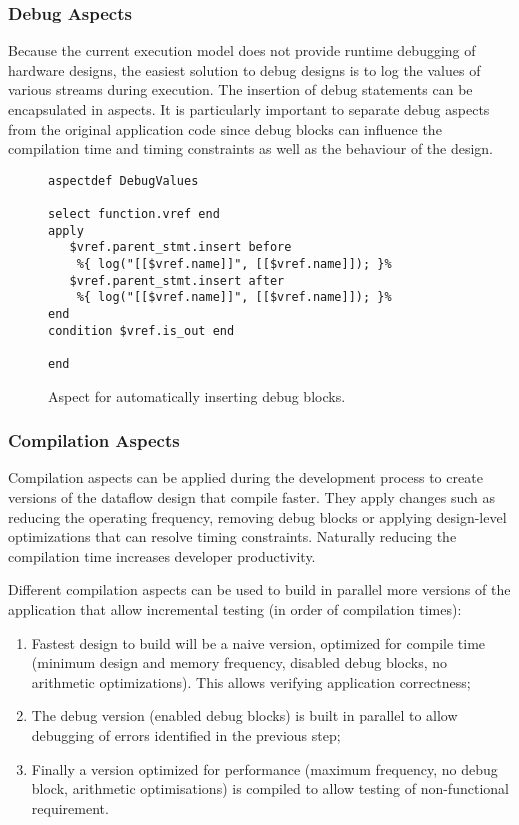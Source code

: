 \lstset{style=MaxC}


\subsubsection{Debug Aspects}

Because the current execution model does not provide runtime debugging
of hardware designs, the easiest solution to debug designs is to log
the values of various streams during execution. The insertion of debug
statements can be encapsulated in aspects. It is particularly
important to separate debug aspects from the original application code
since debug blocks can influence the compilation time and timing
constraints as well as the behaviour of the design.

\lstset{style=lara}
\begin{figure}[!h]
  \centering
\begin{lstlisting}
aspectdef DebugValues

select function.vref end
apply
   $vref.parent_stmt.insert before
    %{ log("[[$vref.name]]", [[$vref.name]]); }%
   $vref.parent_stmt.insert after
    %{ log("[[$vref.name]]", [[$vref.name]]); }%
end
condition $vref.is_out end

end
\end{lstlisting}
  \caption{Aspect for automatically inserting debug blocks.}
  \label{fig:aspect-debug}
\end{figure}

\subsubsection{Compilation Aspects}

Compilation aspects can be applied during the development process to
create versions of the dataflow design that compile faster. They apply
changes such as reducing the operating frequency, removing debug
blocks or applying design-level optimizations that can resolve timing
constraints. Naturally reducing the compilation time increases
developer productivity.

Different compilation aspects can be used to build in parallel more
versions of the application that allow incremental testing (in order
of compilation times):
\begin{enumerate}
\item Fastest design to build will be a naive version, optimized for
  compile time (minimum design and memory frequency, disabled debug
  blocks, no arithmetic optimizations). This allows verifying
  application correctness;
\item The debug version (enabled debug blocks) is built in parallel to
  allow debugging of errors identified in the previous step;
\item Finally a version optimized for performance (maximum frequency,
  no debug block, arithmetic optimisations) is compiled to allow
  testing of non-functional requirement.
\end{enumerate}
